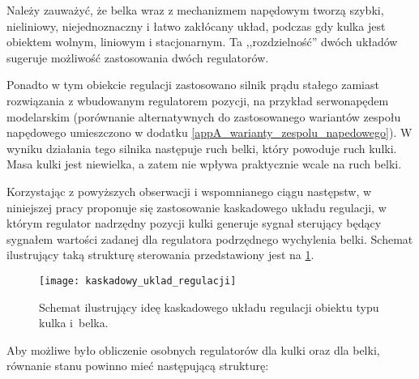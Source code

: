 Należy zauważyć, że belka wraz z mechanizmem napędowym tworzą szybki, nieliniowy, niejednoznaczny i łatwo zakłócany układ, podczas gdy kulka jest obiektem wolnym, liniowym i stacjonarnym. Ta ,,rozdzielność'' dwóch układów sugeruje możliwość zastosowania dwóch regulatorów.

Ponadto w tym obiekcie regulacji zastosowano silnik prądu stałego zamiast rozwiązania z wbudowanym regulatorem pozycji, na przykład serwonapędem modelarskim (porównanie alternatywnych do zastosowanego wariantów zespołu napędowego umieszczono w dodatku \ref{appA_warianty_zespolu_napedowego}). W wyniku dzia\-łania tego silnika następuje ruch belki, który powoduje ruch kulki. Masa kulki jest niewielka, a zatem nie wpływa praktycznie wcale na ruch belki.

Korzystając z powyższych obserwacji i wspomnianego ciągu następstw, w niniejszej pracy proponuje się zastosowanie kaskadowego układu regulacji, w którym regulator nadrzędny pozycji kulki generuje sygnał sterujący będący sygnałem wartości zadanej dla regulatora podrzędnego wychylenia belki. Schemat ilustrujący taką strukturę sterowania przedstawiony jest na \cref{fig:kaskadowy_uklad_regulacji}.

\begin{figure}[h]
    \centering
    \texttt{[image: kaskadowy\_uklad\_regulacji]}
    \caption{Schemat ilustrujący ideę kaskadowego układu regulacji obiektu typu kulka i~belka.}
    \label{fig:kaskadowy_uklad_regulacji}
\end{figure}

\pagebreak

Aby możliwe było obliczenie osobnych regulatorów dla kulki oraz dla belki, równanie stanu powinno mieć następującą strukturę:

